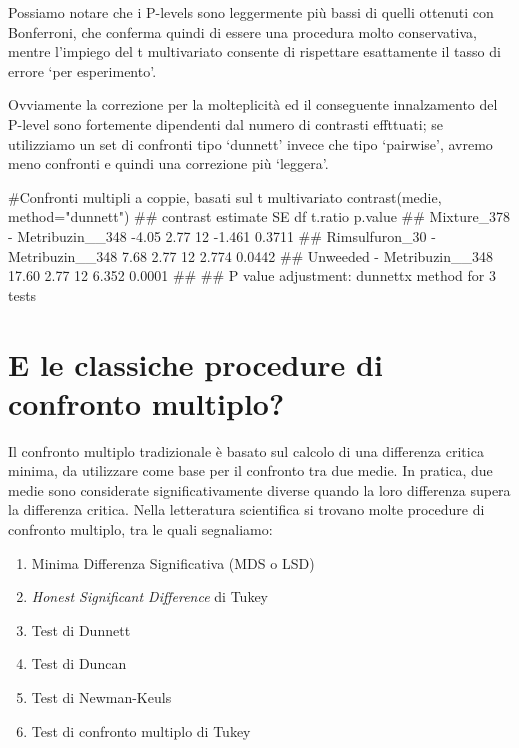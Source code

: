 \documentclass[a4paper,12pt,oneside]{book}
\providecommand{\tightlist}{%
  \setlength{\itemsep}{0pt}\setlength{\parskip}{0pt}}
\newenvironment{Shaded}{\begin{snugshade}}{\end{snugshade}}
\newcommand{\StringTok}[1]{#1}
\newcommand{\CommentTok}[1]{#1}
\newcommand{\DocumentationTok}[1]{#1}
\newcommand{\FunctionTok}[1]{#1}
\newcommand{\AttributeTok}[1]{#1}
\newcommand{\NormalTok}[1]{#1}
\begin{document}
\normalsize

Possiamo notare che i P-levels sono leggermente più bassi di quelli ottenuti con Bonferroni, che conferma quindi di essere una procedura molto conservativa, mentre l'impiego del t multivariato consente di rispettare esattamente il tasso di errore `per esperimento'.

Ovviamente la correzione per la molteplicità ed il conseguente innalzamento del P-level sono fortemente dipendenti dal numero di contrasti effttuati; se utilizziamo un set di confronti tipo `dunnett' invece che tipo `pairwise', avremo meno confronti e quindi una correzione più `leggera'.

\begin{Shaded}
\begin{Highlighting}[]
\CommentTok{\#Confronti multipli a coppie, basati sul t multivariato}
\FunctionTok{contrast}\NormalTok{(medie, }\AttributeTok{method=}\StringTok{"dunnett"}\NormalTok{)}
\DocumentationTok{\#\#  contrast                         estimate   SE df t.ratio p.value}
\DocumentationTok{\#\#  Mixture\_378 {-} Metribuzin\_\_348       {-}4.05 2.77 12  {-}1.461  0.3711}
\DocumentationTok{\#\#  Rimsulfuron\_30 {-} Metribuzin\_\_348     7.68 2.77 12   2.774  0.0442}
\DocumentationTok{\#\#  Unweeded {-} Metribuzin\_\_348          17.60 2.77 12   6.352  0.0001}
\DocumentationTok{\#\# }
\DocumentationTok{\#\# P value adjustment: dunnettx method for 3 tests}
\end{Highlighting}
\end{Shaded}

\hypertarget{e-le-classiche-procedure-di-confronto-multiplo}{%
\section{E le classiche procedure di confronto multiplo?}\label{e-le-classiche-procedure-di-confronto-multiplo}}

Il confronto multiplo tradizionale è basato sul calcolo di una differenza critica minima, da utilizzare come base per il confronto tra due medie. In pratica, due medie sono considerate significativamente diverse quando la loro differenza supera la differenza critica. Nella letteratura scientifica si trovano molte procedure di confronto multiplo, tra le quali segnaliamo:

\begin{enumerate}
\def\labelenumi{\arabic{enumi}.}
\tightlist
\item
  Minima Differenza Significativa (MDS o LSD)
\item
  \emph{Honest Significant Difference} di Tukey
\item
  Test di Dunnett
\item
  Test di Duncan
\item
  Test di Newman-Keuls
\item
  Test di confronto multiplo di Tukey
\end{enumerate}
\end{document}
